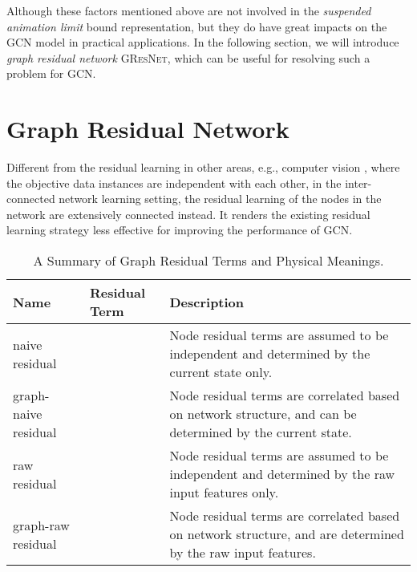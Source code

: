 \documentclass{article}
\newcommand{\gresnet}{\textsc{GResNet}}
\newcommand{\gcn}{\textsc{GCN}}
\begin{document}
Although these factors mentioned above are not involved in the \textit{suspended animation limit} bound representation, but they do have great impacts on the {\gcn} model in practical applications. In the following section, we will introduce \textit{graph residual network} {\gresnet}, which can be useful for resolving such a problem for {\gcn}.














\vspace{-8pt}
\section{Graph Residual Network}\label{sec:method}
\vspace{-8pt}

Different from the residual learning in other areas, e.g., computer vision \cite{HZRS15}, where the objective data instances are independent with each other, in the inter-connected network learning setting, the residual learning of the nodes in the network are extensively connected instead. It renders the existing residual learning strategy less effective for improving the performance of {\gcn}.

\begin{table}[t]
\vspace{-35pt}
\caption{A Summary of Graph Residual Terms and Physical Meanings.} \label{tab:residual_summary}
\vspace{-5pt}
\hspace{-20pt}
\centering
\setlength{\tabcolsep}{0.2em}
\begin{tabular}{p{1.7cm} p{4.5cm} p{8.0cm}}
\hline
Name & Residual Term    & Description\\
\hline
\hline
naive residual & \vspace{1pt}\vspace{1pt}       & Node residual terms are assumed to be independent and determined by the current state only.\\
\hline
graph-naive residual  &\vspace{1pt}       & Node residual terms are correlated based on network structure, and can be determined by the current state. \\
\hline
raw residual  &\vspace{1pt}       & Node residual terms are assumed to be independent and determined by the raw input features only. \\
\hline
graph-raw residual  &\vspace{1pt}       & Node residual terms are correlated based on network structure, and are determined by the raw input features. \\
\hline
\end{tabular}
\vspace{-10pt}
\end{table}
\end{document}
